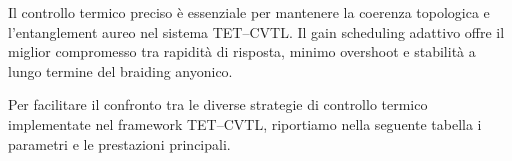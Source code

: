 \documentclass[11pt,a4paper]{article}
\theoremstyle{plain}
\theoremstyle{definition}
\begin{document}
\vspace{0.2cm}


Il controllo termico preciso è essenziale per mantenere la coerenza topologica e l'entanglement aureo nel sistema TET--CVTL. Il gain scheduling adattivo offre il miglior compromesso tra rapidità di risposta, minimo overshoot e stabilità a lungo termine del braiding anyonico.


\vspace{0.2cm}





Per facilitare il confronto tra le diverse strategie di controllo termico implementate nel framework TET--CVTL, riportiamo nella seguente tabella i parametri e le prestazioni principali.

\vspace{0.4cm}
\end{document}
